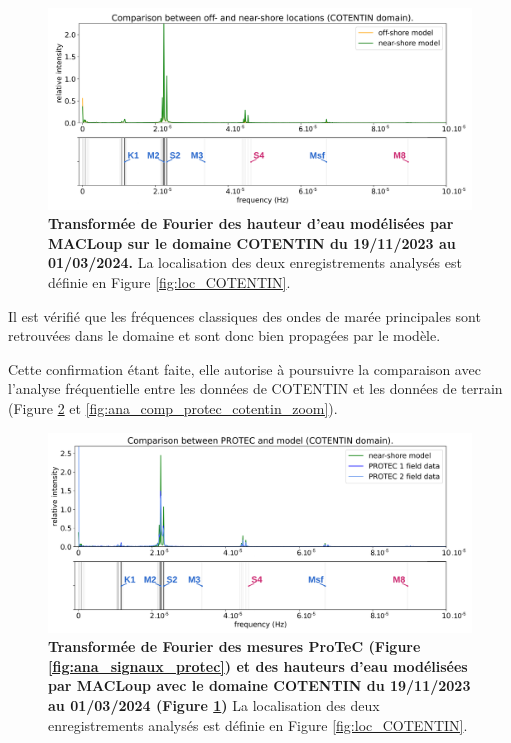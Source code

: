 \documentclass[10pt,a4paper,titlepage]{article}
\begin{document}
\begin{figure}[h!]
	\centering
	\includegraphics[scale=0.4]{../images/post_traitement/COTENTIN_analyse_off-near-shore.pdf}
	\caption{
		\textbf{Transformée de Fourier des hauteur d'eau modélisées par MACLoup sur le domaine COTENTIN du 19/11/2023 au 01/03/2024.}
		La localisation des deux enregistrements analysés est définie en Figure \ref{fig:loc_COTENTIN}.
	}
	\label{fig:ana_COTENTIN}
\end{figure}

Il est vérifié que les fréquences classiques des ondes de marée principales sont retrouvées dans le domaine et sont donc bien propagées par le modèle.

Cette confirmation étant faite, elle autorise à poursuivre la comparaison avec l'analyse fréquentielle entre les données de COTENTIN et les données de terrain (Figure \ref{fig:ana_comp_protec_cotentin} et \ref{fig:ana_comp_protec_cotentin_zoom}).

\begin{figure}[H]
	\centering
	\includegraphics[scale=0.4]{../images/post_traitement/COTENTIN_analyse_near-shore.pdf}
	\caption{
		\textbf{Transformée de Fourier des mesures ProTeC (Figure \ref{fig:ana_signaux_protec}) et des hauteurs d'eau modélisées par MACLoup avec le domaine COTENTIN du 19/11/2023 au 01/03/2024 (Figure \ref{fig:ana_COTENTIN})}
		La localisation des deux enregistrements analysés est définie en Figure \ref{fig:loc_COTENTIN}.
	}
	\label{fig:ana_comp_protec_cotentin}
\end{figure}
\end{document}

